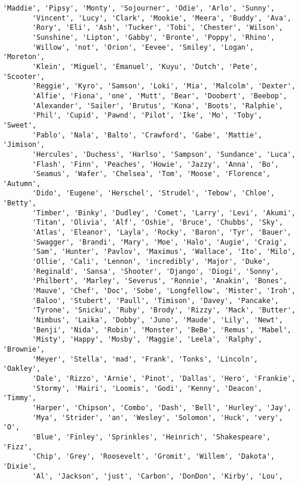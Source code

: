\documentclass[11pt]{article}
\begin{document}
\begin{tcolorbox}[breakable, size=fbox, boxrule=.5pt, pad at break*=1mm, opacityfill=0]
\begin{Verbatim}[commandchars=\\\{\}]
       'Maddie', 'Pipsy', 'Monty', 'Sojourner', 'Odie', 'Arlo', 'Sunny',
       'Vincent', 'Lucy', 'Clark', 'Mookie', 'Meera', 'Buddy', 'Ava',
       'Rory', 'Eli', 'Ash', 'Tucker', 'Tobi', 'Chester', 'Wilson',
       'Sunshine', 'Lipton', 'Gabby', 'Bronte', 'Poppy', 'Rhino',
       'Willow', 'not', 'Orion', 'Eevee', 'Smiley', 'Logan', 'Moreton',
       'Klein', 'Miguel', 'Emanuel', 'Kuyu', 'Dutch', 'Pete', 'Scooter',
       'Reggie', 'Kyro', 'Samson', 'Loki', 'Mia', 'Malcolm', 'Dexter',
       'Alfie', 'Fiona', 'one', 'Mutt', 'Bear', 'Doobert', 'Beebop',
       'Alexander', 'Sailer', 'Brutus', 'Kona', 'Boots', 'Ralphie',
       'Phil', 'Cupid', 'Pawnd', 'Pilot', 'Ike', 'Mo', 'Toby', 'Sweet',
       'Pablo', 'Nala', 'Balto', 'Crawford', 'Gabe', 'Mattie', 'Jimison',
       'Hercules', 'Duchess', 'Harlso', 'Sampson', 'Sundance', 'Luca',
       'Flash', 'Finn', 'Peaches', 'Howie', 'Jazzy', 'Anna', 'Bo',
       'Seamus', 'Wafer', 'Chelsea', 'Tom', 'Moose', 'Florence', 'Autumn',
       'Dido', 'Eugene', 'Herschel', 'Strudel', 'Tebow', 'Chloe', 'Betty',
       'Timber', 'Binky', 'Dudley', 'Comet', 'Larry', 'Levi', 'Akumi',
       'Titan', 'Olivia', 'Alf', 'Oshie', 'Bruce', 'Chubbs', 'Sky',
       'Atlas', 'Eleanor', 'Layla', 'Rocky', 'Baron', 'Tyr', 'Bauer',
       'Swagger', 'Brandi', 'Mary', 'Moe', 'Halo', 'Augie', 'Craig',
       'Sam', 'Hunter', 'Pavlov', 'Maximus', 'Wallace', 'Ito', 'Milo',
       'Ollie', 'Cali', 'Lennon', 'incredibly', 'Major', 'Duke',
       'Reginald', 'Sansa', 'Shooter', 'Django', 'Diogi', 'Sonny',
       'Philbert', 'Marley', 'Severus', 'Ronnie', 'Anakin', 'Bones',
       'Mauve', 'Chef', 'Doc', 'Sobe', 'Longfellow', 'Mister', 'Iroh',
       'Baloo', 'Stubert', 'Paull', 'Timison', 'Davey', 'Pancake',
       'Tyrone', 'Snicku', 'Ruby', 'Brody', 'Rizzy', 'Mack', 'Butter',
       'Nimbus', 'Laika', 'Dobby', 'Juno', 'Maude', 'Lily', 'Newt',
       'Benji', 'Nida', 'Robin', 'Monster', 'BeBe', 'Remus', 'Mabel',
       'Misty', 'Happy', 'Mosby', 'Maggie', 'Leela', 'Ralphy', 'Brownie',
       'Meyer', 'Stella', 'mad', 'Frank', 'Tonks', 'Lincoln', 'Oakley',
       'Dale', 'Rizzo', 'Arnie', 'Pinot', 'Dallas', 'Hero', 'Frankie',
       'Stormy', 'Mairi', 'Loomis', 'Godi', 'Kenny', 'Deacon', 'Timmy',
       'Harper', 'Chipson', 'Combo', 'Dash', 'Bell', 'Hurley', 'Jay',
       'Mya', 'Strider', 'an', 'Wesley', 'Solomon', 'Huck', 'very', 'O',
       'Blue', 'Finley', 'Sprinkles', 'Heinrich', 'Shakespeare', 'Fizz',
       'Chip', 'Grey', 'Roosevelt', 'Gromit', 'Willem', 'Dakota', 'Dixie',
       'Al', 'Jackson', 'just', 'Carbon', 'DonDon', 'Kirby', 'Lou',

\end{Verbatim}
\end{tcolorbox}
\end{document}
